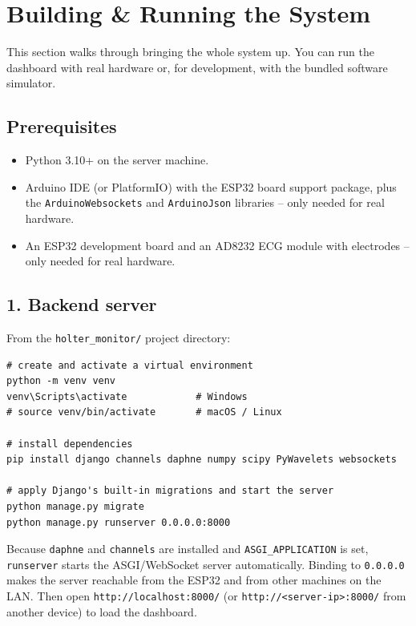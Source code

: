 \section{Building \& Running the System}

This section walks through bringing the whole system up. You can run the dashboard
with real hardware or, for development, with the bundled software simulator.

\subsection{Prerequisites}
\begin{itemize}[noitemsep]
  \item Python 3.10+ on the server machine.
  \item Arduino IDE (or PlatformIO) with the ESP32 board support package, plus the
        \texttt{ArduinoWebsockets} and \texttt{ArduinoJson} libraries -- only needed
        for real hardware.
  \item An ESP32 development board and an AD8232 ECG module with electrodes -- only
        needed for real hardware.
\end{itemize}

\subsection{1. Backend server}
From the \texttt{holter\_monitor/} project directory:
\begin{lstlisting}[style=base,caption={Set up and run the Django/Channels server.}]
# create and activate a virtual environment
python -m venv venv
venv\Scripts\activate            # Windows
# source venv/bin/activate       # macOS / Linux

# install dependencies
pip install django channels daphne numpy scipy PyWavelets websockets

# apply Django's built-in migrations and start the server
python manage.py migrate
python manage.py runserver 0.0.0.0:8000
\end{lstlisting}

Because \texttt{daphne} and \texttt{channels} are installed and
\texttt{ASGI\_APPLICATION} is set, \texttt{runserver} starts the ASGI/WebSocket
server automatically. Binding to \texttt{0.0.0.0} makes the server reachable from
the ESP32 and from other machines on the LAN. Then open
\texttt{http://localhost:8000/} (or \texttt{http://<server-ip>:8000/} from another
device) to load the dashboard.


